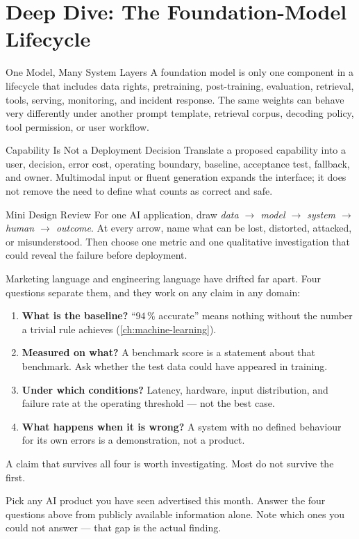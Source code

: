 %
\section{Deep Dive: The Foundation-Model Lifecycle}
\begin{v3topic}{One Model, Many System Layers}
A foundation model is only one component in a lifecycle that includes data
rights, pretraining, post-training, evaluation, retrieval, tools, serving,
monitoring, and incident response.
The same weights can behave very differently under another prompt template,
retrieval corpus, decoding policy, tool permission, or user workflow.

\end{v3topic}
\begin{v3topic}{Capability Is Not a Deployment Decision}
Translate a proposed capability into a user, decision, error cost, operating
boundary, baseline, acceptance test, fallback, and owner.
Multimodal input or fluent generation expands the interface; it does not remove
the need to define what counts as correct and safe.

\end{v3topic}
\begin{v3topic}{Mini Design Review}
For one AI application, draw
\emph{data $\rightarrow$ model $\rightarrow$ system $\rightarrow$ human
$\rightarrow$ outcome}.
At every arrow, name what can be lost, distorted, attacked, or misunderstood.
Then choose one metric and one qualitative investigation that could reveal the
failure before deployment.
\end{v3topic}


\begin{cautionbox}
Marketing language and engineering language have drifted far apart. Four
questions separate them, and they work on any claim in any domain:
\begin{enumerate}
  \item \textbf{What is the baseline?} ``$94\,\%$ accurate'' means nothing
        without the number a trivial rule achieves
        (\cref{ch:machine-learning}).
  \item \textbf{Measured on what?} A benchmark score is a statement about that
        benchmark. Ask whether the test data could have appeared in training.
  \item \textbf{Under which conditions?} Latency, hardware, input distribution,
        and failure rate at the operating threshold --- not the best case.
  \item \textbf{What happens when it is wrong?} A system with no defined
        behaviour for its own errors is a demonstration, not a product.
\end{enumerate}
A claim that survives all four is worth investigating. Most do not survive the
first.
\end{cautionbox}

\begin{checkpoint}
Pick any AI product you have seen advertised this month. Answer the four
questions above from publicly available information alone. Note which ones you
could not answer --- that gap is the actual finding.
\end{checkpoint}

